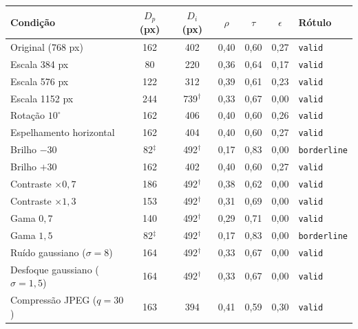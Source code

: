 \begin{tabular}{lcccccl}
\toprule
Condição & $D_p$ (px) & $D_i$ (px) & $\rho$ & $\tau$ & $\epsilon$ & Rótulo \\
\midrule
Original (768 px) & 162 & 402 & 0,40 & 0,60 & 0,27 & \texttt{valid} \\
Escala 384 px & 80 & 220 & 0,36 & 0,64 & 0,17 & \texttt{valid} \\
Escala 576 px & 122 & 312 & 0,39 & 0,61 & 0,23 & \texttt{valid} \\
Escala 1152 px & 244 & 739$^\dagger$ & 0,33 & 0,67 & 0,00 & \texttt{valid} \\
Rotação $10^\circ$ & 162 & 406 & 0,40 & 0,60 & 0,26 & \texttt{valid} \\
Espelhamento horizontal & 162 & 404 & 0,40 & 0,60 & 0,27 & \texttt{valid} \\
\midrule
Brilho $-30$ & 82$^\ddagger$ & 492$^\dagger$ & 0,17 & 0,83 & 0,00 & \texttt{borderline} \\
Brilho $+30$ & 162 & 402 & 0,40 & 0,60 & 0,27 & \texttt{valid} \\
Contraste $\times0{,}7$ & 186 & 492$^\dagger$ & 0,38 & 0,62 & 0,00 & \texttt{valid} \\
Contraste $\times1{,}3$ & 153 & 492$^\dagger$ & 0,31 & 0,69 & 0,00 & \texttt{valid} \\
Gama $0{,}7$ & 140 & 492$^\dagger$ & 0,29 & 0,71 & 0,00 & \texttt{valid} \\
Gama $1{,}5$ & 82$^\ddagger$ & 492$^\dagger$ & 0,17 & 0,83 & 0,00 & \texttt{borderline} \\
Ruído gaussiano ($\sigma=8$) & 164 & 492$^\dagger$ & 0,33 & 0,67 & 0,00 & \texttt{valid} \\
Desfoque gaussiano ($\sigma=1{,}5$) & 164 & 492$^\dagger$ & 0,33 & 0,67 & 0,00 & \texttt{valid} \\
Compressão JPEG ($q=30$) & 163 & 394 & 0,41 & 0,59 & 0,30 & \texttt{valid} \\
\bottomrule
\end{tabular}
